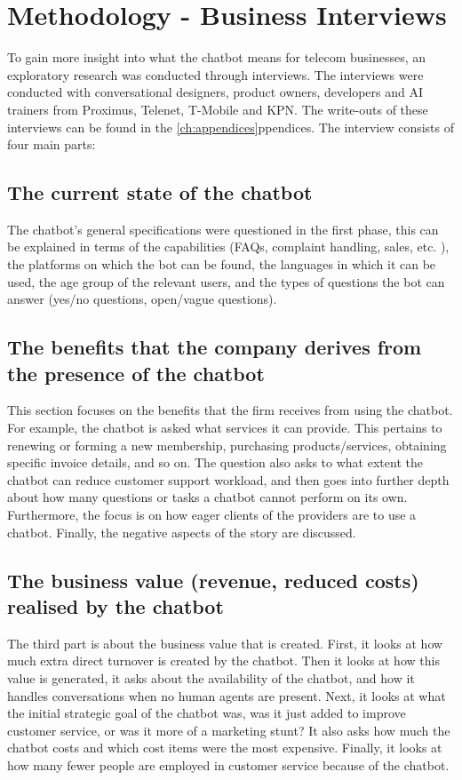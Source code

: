 \section{Methodology - Business Interviews}
To gain more insight into what the chatbot means for telecom businesses, an exploratory research was conducted through interviews. The interviews were conducted with conversational designers, product owners, developers and AI trainers from Proximus, Telenet, T-Mobile and KPN. The write-outs of these interviews can be found in the \ref{ch:appendices}ppendices. The interview consists of four main parts:

\subsection{The current state of the chatbot}
The chatbot's general specifications were questioned in the first phase, this can be explained in terms of the capabilities (FAQs, complaint handling, sales, etc. ), the platforms on which the bot can be found, the languages in which it can be used, the age group of the relevant users, and the types of questions the bot can answer (yes/no questions, open/vague questions).

\subsection{The benefits that the company derives from the presence of the chatbot}
This section focuses on the benefits that the firm receives from using the chatbot. For example, the chatbot is asked what services it can provide. This pertains to renewing or forming a new membership, purchasing products/services, obtaining specific invoice details, and so on. The question also asks to what extent the chatbot can reduce customer support workload, and then goes into further depth about how many questions or tasks a chatbot cannot perform on its own. Furthermore, the focus is on how eager clients of the providers are to use a chatbot. Finally, the negative aspects of the story are discussed.

\subsection{The business value (revenue, reduced costs) realised by the chatbot}
The third part is about the business value that is created. First, it looks at how much extra direct turnover is created by the chatbot. Then it looks at how this value is generated, it asks about the availability of the chatbot, and how it handles conversations when no human agents are present. Next, it looks at what the initial strategic goal of the chatbot was, was it just added to improve customer service, or was it more of a marketing stunt?  It also asks how much the chatbot costs and which cost items were the most expensive. Finally, it looks at how many fewer people are employed in customer service because of the chatbot.


